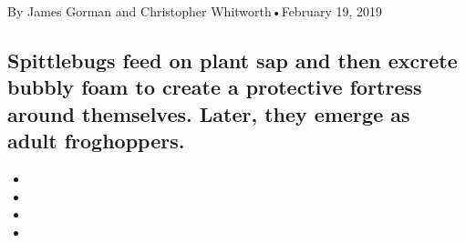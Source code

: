 By James Gorman and Christopher Whitworth•February 19, 2019

\hypertarget{spittlebugs-feed-on-plant-sap-and-then-excrete-bubbly-foam-to-create-a-protective-fortress-around-themselves-later-they-emerge-as-adult-froghoppers-1}{%
\subsection{Spittlebugs feed on plant sap and then excrete bubbly foam
to create a protective fortress around themselves. Later, they emerge as
adult
froghoppers.}\label{spittlebugs-feed-on-plant-sap-and-then-excrete-bubbly-foam-to-create-a-protective-fortress-around-themselves-later-they-emerge-as-adult-froghoppers-1}}

\begin{itemize}
\item
\item
\item
\item
\end{itemize}

